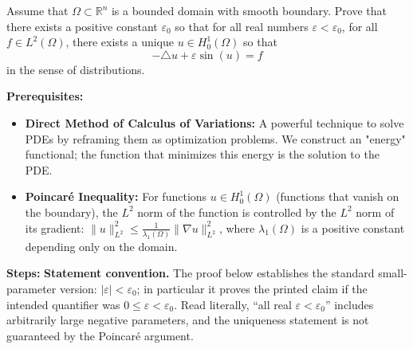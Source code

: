 \begin{exercise}
\label{analysis:2021:6}
Assume that $\Omega\subset\mathbb{R}^n$ is a bounded domain with smooth boundary. Prove that there exists a positive constant $\varepsilon_0$ so that for all real numbers $\varepsilon<\varepsilon_0$, for all $f\in L^2(\Omega)$, there exists a unique $u\in H_0^1(\Omega)$ so that
\[
-\triangle u + \varepsilon\sin(u) = f
\]
in the sense of distributions.
\end{exercise}

\begin{solution}
\textbf{Prerequisites:}
\begin{itemize}
    \item \textbf{Direct Method of Calculus of Variations:} A powerful technique to solve PDEs by reframing them as optimization problems. We construct an "energy" functional; the function that minimizes this energy is the solution to the PDE.
    \item \textbf{Poincaré Inequality:} For functions $u \in H_0^1(\Omega)$ (functions that vanish on the boundary), the $L^2$ norm of the function is controlled by the $L^2$ norm of its gradient: $\|u\|_{L^2}^2 \leq \frac{1}{\lambda_1(\Omega)} \|\nabla u\|_{L^2}^2$, where $\lambda_1(\Omega)$ is a positive constant depending only on the domain.
\end{itemize}

\textbf{Steps:}
\textbf{Statement convention.}
The proof below establishes the standard small-parameter version: $|\varepsilon|<\varepsilon_0$; in particular it proves the printed claim if the intended quantifier was $0\leq\varepsilon<\varepsilon_0$.  Read literally, ``all real $\varepsilon<\varepsilon_0$'' includes arbitrarily large negative parameters, and the uniqueness statement is not guaranteed by the Poincar\'e argument.


\end{solution}
